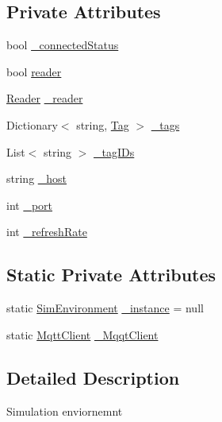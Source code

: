 \subsection*{Private Attributes}
\begin{DoxyCompactItemize}
\item 
bool \hyperlink{class_pozyx_subscriber_1_1_sim_environment_a71e86b3047a367d0bfd08c92ce480509}{\+\_\+connected\+Status}
\item 
bool \hyperlink{class_pozyx_subscriber_1_1_sim_environment_a85870c67295486d7abb27f35603a4356}{reader}
\item 
\hyperlink{class_pozyx_subscriber_1_1_framework_1_1_reader}{Reader} \hyperlink{class_pozyx_subscriber_1_1_sim_environment_a97683f60e678f6552639b2d79d31cf3d}{\+\_\+reader}
\item 
Dictionary$<$ string, \hyperlink{class_pozyx_subscriber_1_1_framework_1_1_tag}{Tag} $>$ \hyperlink{class_pozyx_subscriber_1_1_sim_environment_a7a9050254e24024b517089b736316881}{\+\_\+tags}
\item 
List$<$ string $>$ \hyperlink{class_pozyx_subscriber_1_1_sim_environment_a726825a7059b308b64e9bc3787808327}{\+\_\+tag\+I\+Ds}
\item 
string \hyperlink{class_pozyx_subscriber_1_1_sim_environment_a40a0a0fd989252d51605ba77653818c8}{\+\_\+host}
\item 
int \hyperlink{class_pozyx_subscriber_1_1_sim_environment_a5667a6367405f1c0a2ffe300f4245590}{\+\_\+port}
\item 
int \hyperlink{class_pozyx_subscriber_1_1_sim_environment_a45020f3e4a891fdb094d5dc29cfe8291}{\+\_\+refresh\+Rate}
\end{DoxyCompactItemize}
\subsection*{Static Private Attributes}
\begin{DoxyCompactItemize}
\item 
static \hyperlink{class_pozyx_subscriber_1_1_sim_environment}{Sim\+Environment} \hyperlink{class_pozyx_subscriber_1_1_sim_environment_a5d5b39ad30ad8758fb7f53aaa50fc1fb}{\+\_\+instance} = null
\item 
static \hyperlink{class_pozyx_subscriber_1_1_framework_1_1_mqtt_client}{Mqtt\+Client} \hyperlink{class_pozyx_subscriber_1_1_sim_environment_a391436676bf93116d83dd7c422c5b8cd}{\+\_\+\+Mqqt\+Client}
\end{DoxyCompactItemize}


\subsection{Detailed Description}
Simulation enviornemnt 



